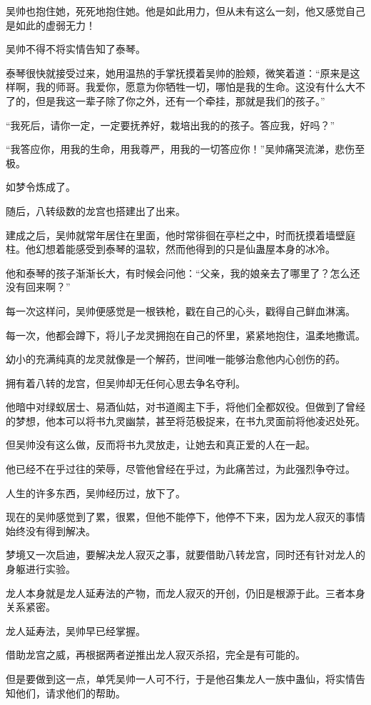 \begin{this_body}
吴帅也抱住她，死死地抱住她。他是如此用力，但从未有这么一刻，他又感觉自己是如此的虚弱无力！

吴帅不得不将实情告知了泰琴。

泰琴很快就接受过来，她用温热的手掌抚摸着吴帅的脸颊，微笑着道：“原来是这样啊，我的师哥。我爱你，愿意为你牺牲一切，哪怕是我的生命。这没有什么大不了的，但是我这一辈子除了你之外，还有一个牵挂，那就是我们的孩子。”

“我死后，请你一定，一定要抚养好，栽培出我的的孩子。答应我，好吗？”

“我答应你，用我的生命，用我尊严，用我的一切答应你！”吴帅痛哭流涕，悲伤至极。

如梦令炼成了。

随后，八转级数的龙宫也搭建出了出来。

建成之后，吴帅就常年居住在里面，他时常徘徊在亭栏之中，时而抚摸着墙壁庭柱。他幻想着能感受到泰琴的温软，然而他得到的只是仙蛊屋本身的冰冷。

他和泰琴的孩子渐渐长大，有时候会问他：“父亲，我的娘亲去了哪里了？怎么还没有回来啊？”

每一次这样问，吴帅便感觉是一根铁枪，戳在自己的心头，戳得自己鲜血淋漓。

每一次，他都会蹲下，将儿子龙灵拥抱在自己的怀里，紧紧地抱住，温柔地撒谎。

幼小的充满纯真的龙灵就像是一个解药，世间唯一能够治愈他内心创伤的药。

拥有着八转的龙宫，但吴帅却无任何心思去争名夺利。

他暗中对绿蚁居士、易酒仙姑，对书道阁主下手，将他们全都奴役。但做到了曾经的梦想，他本可以将书九灵幽禁，甚至将范极捉来，在书九灵面前将他凌迟处死。

但吴帅没有这么做，反而将书九灵放走，让她去和真正爱的人在一起。

他已经不在乎过往的荣辱，尽管他曾经在乎过，为此痛苦过，为此强烈争夺过。

人生的许多东西，吴帅经历过，放下了。

现在的吴帅感觉到了累，很累，但他不能停下，他停不下来，因为龙人寂灭的事情始终没有得到解决。

梦境又一次启迪，要解决龙人寂灭之事，就要借助八转龙宫，同时还有针对龙人的身躯进行实验。

龙人本身就是龙人延寿法的产物，而龙人寂灭的开创，仍旧是根源于此。三者本身关系紧密。

龙人延寿法，吴帅早已经掌握。

借助龙宫之威，再根据两者逆推出龙人寂灭杀招，完全是有可能的。

但是要做到这一点，单凭吴帅一人可不行，于是他召集龙人一族中蛊仙，将实情告知他们，请求他们的帮助。


\end{this_body}
